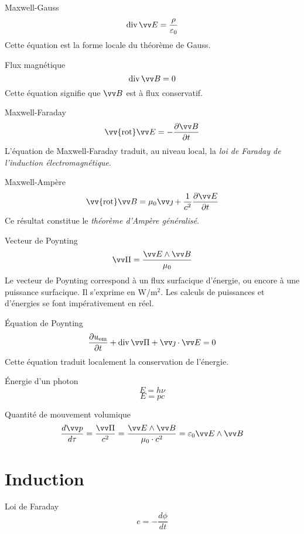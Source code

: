 \documentclass[french, a4paper, 11pt, twocolumn]{article}
\DeclareMathOperator{\diverg}{div}        %
\newcommand{\rota}{\vv{\mathrm{rot}}}    %
\begin{document}
\begin{cadre}{Maxwell-Gauss}
    \[\diverg \vv E = \dfrac{\rho}{\varepsilon_{0}}\]
    \tcblower
    Cette équation est la forme locale du théorème de Gauss.
\end{cadre}

\begin{cadre}{Flux magnétique}
    \[\diverg \vv B = 0\]
    \tcblower
    Cette équation signifie que \(\vv B\) est à flux conservatif.
\end{cadre}

\begin{cadre}{Maxwell-Faraday}
  \[\rota \vv E = -\dfrac{\partial \vv B}{\partial t}\]
  \tcblower
  L'équation de Maxwell-Faraday traduit, au niveau local, la \emph{loi de Faraday de l'induction électromagnétique}.
\end{cadre}

\begin{cadre}{Maxwell-Ampère}
    \[\rota \vv B = \mu_{0}\vv\jmath+\dfrac{1}{c^{2}}\dfrac{\partial\vv E}{\partial t}\]
    \tcblower
    Ce résultat constitue le \emph{théorème d'Ampère généralisé}.
\end{cadre}

\begin{cadre}{Vecteur de Poynting}
  \[\vv\Pi = \dfrac{\vv E\wedge\vv B}{\mu_{0}}\]
  Le vecteur de Poynting correspond à un flux surfacique d'énergie, ou encore à une puissance surfacique. Il s'exprime en \(\si{\watt\per\meter\squared}\).
  Les calculs de puissances et d'énergies se font impérativement en réel.
\end{cadre}

\begin{cadre}{Équation de Poynting}
  \[\dfrac{\partial u_{\text{em}}}{\partial t} + \diverg \vv\Pi + \vv\jmath\cdot\vv E = 0\]
  Cette équation traduit localement la conservation de l'énergie.
\end{cadre}

\begin{cadre}{Énergie d'un photon}
  \[E = h\nu\]
  \[E = pc\]
\end{cadre}

\begin{cadre}{Quantité de mouvement volumique}
  \[\dfrac{d\vv p}{d\tau} = \dfrac{\vv \Pi}{c^{2}} = \dfrac{\vv E \wedge\vv B}{\mu_{0}\cdot c^{2}}=\varepsilon_{0}\vv E\wedge\vv B\]
\end{cadre}

\section{Induction}
\begin{cadre}{Loi de Faraday}
  \[e = -\dfrac{d\phi}{dt}\]
\end{cadre}
\end{document}
